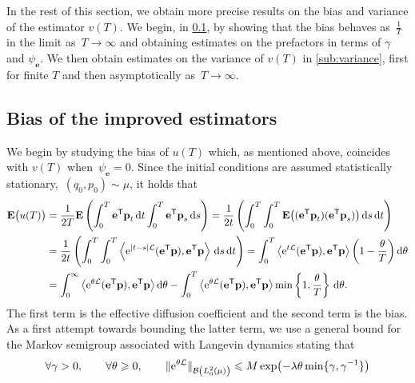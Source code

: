 \documentclass[11pt,a4paper]{article}
\newcommand{\e}{\mathrm{e}}
\newcommand{\expect}[0]{\mathbf{E}}
\newcommand{\vect}[1]{\boldsymbol{\mathbf #1}}
\renewcommand{\d}{\mathrm d}
\renewcommand{\t}{\mathsf T}
\theoremstyle{plain}
\numberwithin{equation}{section}
\renewcommand{\leq}{\leqslant}
\renewcommand{\geq}{\geqslant}
\begin{document}
In the rest of this section,
we obtain more precise results on the bias and variance of the estimator $v(T)$.
We begin,
in \cref{sub:bias},
by showing that the bias behaves as~$\frac{1}{T}$ in the limit as~$T \to \infty$
and obtaining estimates on the prefactors in terms of $\gamma$ and $\psi_{\vect e}$.
We then obtain estimates on the variance of $v(T)$ in \cref{sub:variance},
first for finite $T$ and then asymptotically as~$T \to \infty$.

\subsection{Bias of the improved estimators}%
\label{sub:bias}
We begin by studying the bias of $u(T)$ which,
as mentioned above, coincides with $v(T)$ when~$\psi_{\vect e} = 0$.
Since the initial conditions are assumed statistically stationary,~$(q_0, p_0) \sim \mu$,
it holds that
\begin{equation}
\label{eq:bias_without_control}
\begin{aligned}
    \expect \bigl(u(T)\bigr)
    &= \frac{1}{2T} \expect \left( \int_{0}^{T} \vect e^\t \vect p_{t} \, \d t \int_{0}^{T} \vect e^\t \vect p_s \, \d s \right)
    = \frac{1}{2t} \left( \int_{0}^{T} \int_{0}^{T} \expect \bigl((\vect e^\t \vect p_t) (\vect e^\t \vect p_s)\bigr) \, \d s \, \d t \right) \\
    &= \frac{1}{2t} \left( \int_{0}^{T} \int_{0}^{T} \ip{\e^{\abs{t - s} \mathcal L}(\vect e^\t \vect p)}{\vect e^\t \vect p} \, \d s \, \d t \right)
    =  \int_{0}^{T} \ip{\e^{t \mathcal L} (\vect e^\t \vect p)}{\vect e^\t \vect p} \left(1 - \frac{\theta}{T}\right) \d \theta  \\
    &= \int_{0}^{\infty} \ip{\e^{\theta \mathcal L}(\vect e^\t \vect p)}{\vect e^\t \vect p}  \d \theta
    - \int_{0}^{T} \ip{\e^{\theta \mathcal L} (\vect e^\t \vect p)}{\vect e^\t \vect p} \min\left\{1, \frac{\theta}{T}\right\} \, \d \theta.
\end{aligned}
\end{equation}
The first term is the effective diffusion coefficient
and the second term is the bias.
As a first attempt towards bounding the latter term,
we use a general bound for the Markov semigroup associated with Langevin dynamics
stating that
\begin{equation}
    \label{eq:decay_semigroup_general}
    \forall \gamma > 0, \qquad \forall \theta \geq 0, \qquad
    \norm*{ \e^{\theta \mathcal L} }[\mathcal B \left(L^2_0\left(\mu\right) \right)] \leq M \exp \bigl(- \lambda \theta \min\{\gamma, \gamma^{-1}\} \bigr)
\end{equation}
\end{document}
